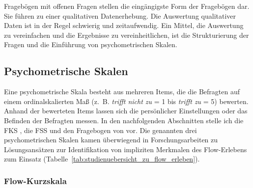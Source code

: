 Fragebögen mit offenen Fragen stellen die eingängigste Form der Fragebögen dar. Sie führen zu einer qualitativen Datenerhebung. Die Auswertung qualitativer Daten ist in der Regel schwierig und zeitaufwendig. Ein Mittel, die Auswertung zu vereinfachen und die Ergebnisse zu vereinheitlichen, ist die Strukturierung der Fragen und die Einführung von psychometrischen Skalen.


\subsection{Psychometrische Skalen} %
\label{sub:psychometrische_skalen}

Eine psychometrische Skala besteht aus mehreren Items, die die Befragten auf einem ordinalskalierten Maß (z.~B. \emph{trifft nicht zu} = 1 bis \emph{trifft zu} = 5) bewerten. Anhand der bewerteten Items lassen sich die persönlicher Einstellungen oder das Befinden der Befragten messen. In den nachfolgenden Abschnitten stelle ich die \ac{FKS} \citep{Rheinberg2003}, die \ac{FSS} \citep{Jackson1996} und den Fragebogen von \citet{Keller2008} vor. Die genannten drei psychometrischen Skalen kamen überwiegend in Forschungsarbeiten zu Lösungsansätzen zur Identifikation von impliziten Merkmalen des Flow-Erlebens zum Einsatz (Tabelle~\ref{tab:studienuebersicht_zu_flow_erleben}).

\subsubsection{Flow-Kurzskala} %
\label{ssub:flow_kurzskala}

